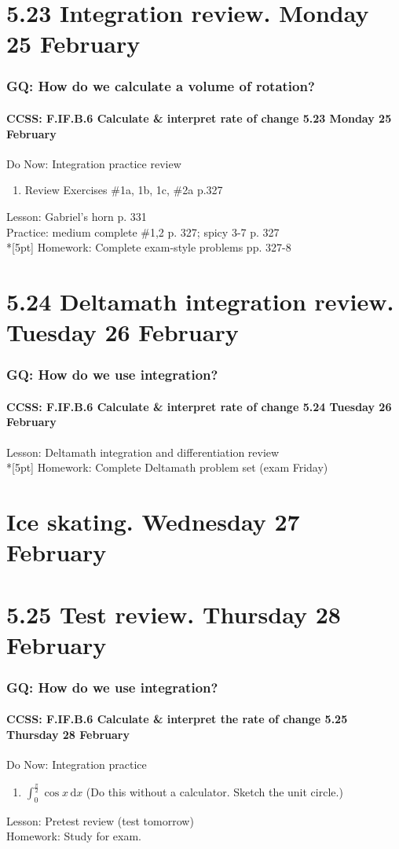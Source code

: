 \documentclass{beamer}
\begin{document}
\section{5.23 Integration review. Monday 25 February}
  \frame
  {
    \frametitle{GQ: How do we calculate a volume of rotation?}
    \framesubtitle{CCSS: F.IF.B.6 Calculate \& interpret rate of change \hfill \alert{5.23 Monday 25 February}}

    \begin{block}{Do Now: Integration practice review}
    \begin{enumerate}
        \item Review Exercises \#1a, 1b, 1c, \#2a p.327
    \end{enumerate}
    \end{block}
    Lesson: Gabriel's horn p. 331\\
    Practice: medium complete \#1,2 p. 327; spicy 3-7 p. 327\\*[5pt]
    Homework: Complete exam-style problems pp. 327-8
  }

  \section{5.24 Deltamath integration review. Tuesday 26 February}
  \frame
  {
    \frametitle{GQ: How do we use integration?}
    \framesubtitle{CCSS: F.IF.B.6 Calculate \& interpret rate of change \hfill \alert{5.24 Tuesday 26 February}}

    Lesson: Deltamath integration and differentiation review\\*[5pt]
    Homework: Complete Deltamath problem set \alert{(exam Friday)}
  }

\section{Ice skating. Wednesday 27 February}

\section{5.25 Test review. Thursday 28 February}
  \frame
  {
    \frametitle{GQ: How do we use integration?}
    \framesubtitle{CCSS: F.IF.B.6 Calculate \& interpret the rate of change \hfill \alert{5.25 Thursday 28 February}}

    \begin{block}{Do Now: Integration practice}
    \begin{enumerate}
      \item $\displaystyle \int_0^{\frac{\pi}{2}} \cos x \,\mathrm{d}x$ (Do this without a calculator. Sketch the unit circle.)
    \end{enumerate}
    \end{block}
    Lesson: Pretest review (\alert{test tomorrow})\\%
    Homework: Study for exam.\\
  }
\end{document}
